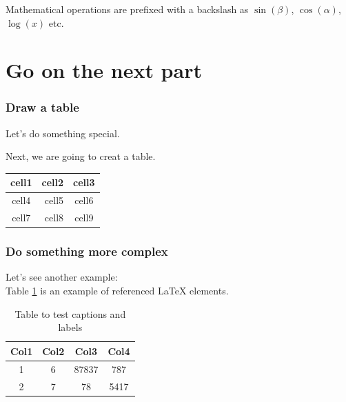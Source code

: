 \documentclass[12pt, letterpaper, twoside]{article}
\begin{document}
Mathematical operations are prefixed with a backslash as $\sin(\beta)$, $\cos(\alpha)$, $\log(x)$ etc.



\part{Go on the next part}

\section{Draw a table}


Let's do something special.

Next, we are going to creat a table.
\begin{center}
	\begin{tabular}{|c|r|c|}
		\hline
		cell1 & cell2 & cell3 \\
		\hline		
		cell4 & cell5 & cell6 \\
		\hline		
		cell7 & cell8 & cell9 \\
		\hline
	\end{tabular}
\end{center}

\section{Do something more complex}
Let's see another example:\\
Table \ref{table:Just an example} is an example of referenced \LaTeX{} elements.
\begin{table}[h!]
	\begin{center}
		\begin{tabular}{||c c c c||}
		\hline
		Col1 & Col2 & Col3 & Col4 \\ [0.5ex]
		\hline\hline
		1 & 6 & 87837 & 787 \\
		\hline
		2 & 7 & 78 & 5417 \\ [1ex]
		\hline	
		\end{tabular}
		\caption{Table to test captions and labels}
		\label{table:Just an example}
	\end{center}
\end{table}
\end{document}

